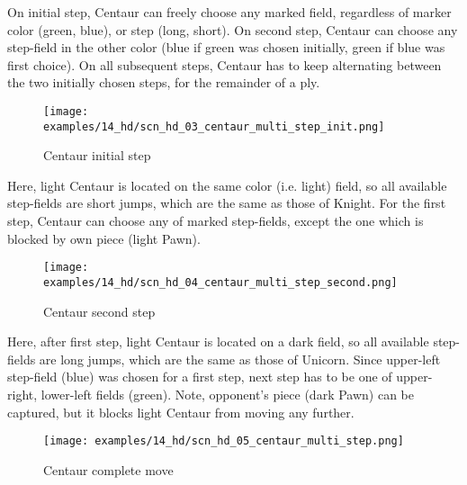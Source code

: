 \vspace*{0.7\baselineskip}
On initial step, Centaur can freely choose any marked field, regardless of marker
color (green, blue), or step (long, short). On second step, Centaur can choose any
step-field in the other color (blue if green was chosen initially, green if blue
was first choice). On all subsequent steps, Centaur has to keep alternating between
the two initially chosen steps, for the remainder of a ply.

\clearpage %

\noindent
\begin{figure}[!h]
\texttt{[image: examples/14\_hd/scn\_hd\_03\_centaur\_multi\_step\_init.png]}
\caption{Centaur initial step}
\label{fig:scn_hd_03_centaur_multi_step_init}
\end{figure}

Here, light Centaur is located on the same color (i.e. light) field, so all available
step-fields are short jumps, which are the same as those of Knight. For the first step,
Centaur can choose any of marked step-fields, except the one which is blocked by own
piece (light Pawn).

\clearpage %

\noindent
\begin{figure}[!h]
\texttt{[image: examples/14\_hd/scn\_hd\_04\_centaur\_multi\_step\_second.png]}
\caption{Centaur second step}
\label{fig:scn_hd_04_centaur_multi_step_second}
\end{figure}

Here, after first step, light Centaur is located on a dark field, so all available
step-fields are long jumps, which are the same as those of Unicorn. Since upper-left
step-field (blue) was chosen for a first step, next step has to be one of upper-right,
lower-left fields (green). Note, opponent's piece (dark Pawn) can be captured, but it
blocks light Centaur from moving any further.

\clearpage %

\noindent
\begin{figure}[!h]
\texttt{[image: examples/14\_hd/scn\_hd\_05\_centaur\_multi\_step.png]}
\caption{Centaur complete move}
\label{fig:scn_hd_05_centaur_multi_step}
\end{figure}

